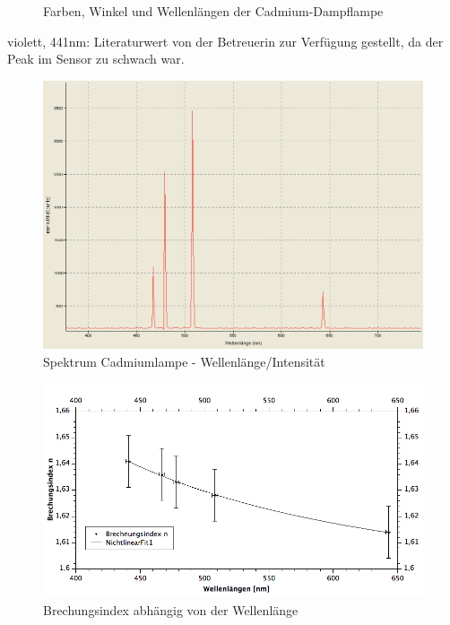 \documentclass[12pt,a4paper]{article}
\begin{document}
\begin{multicols}{2}
\begin{figure}[H]
{			}
	\caption{Farben, Winkel und Wellenlängen der Cadmium-Dampflampe}
	\label{fig:werte_cadmiumdampflampe}
\end{figure}
violett, 441nm: Literaturwert von der Betreuerin zur Verfügung gestellt, da der Peak im Sensor zu schwach war.



\end{multicols}
\begin{figure}[H]
	\centering
	\includegraphics[scale=0.45]{./figure/Spektrum_Cadmiumdampflampe_PW7_Braun_Kurz.png}
	\caption{Spektrum Cadmiumlampe - Wellenlänge/Intensität}
	\label{fig:prisma_wellenlaenge}
\end{figure}

\begin{figure}[H]
	\centering
	\includegraphics[scale=0.50]{./figure/anfpra7_spektrum_grafik.png}
	\caption{Brechungsindex abhängig von der Wellenlänge}
	\label{fig:wellenlaenge_brechungsindex}
\end{figure}
\end{document}

